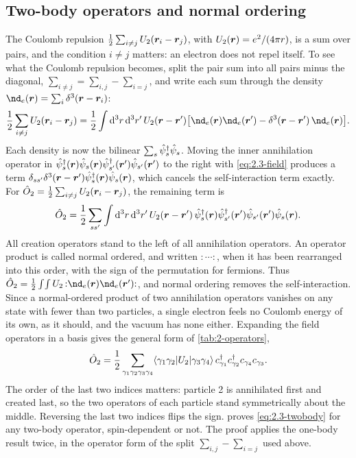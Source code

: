 \subsection{Two-body operators and normal ordering}

The Coulomb repulsion $\tfrac12\sum_{i\ne j}U_2(\bm{r}_i - \bm{r}_j)$, with $U_2(\bm{r}) = e^2/(4\pi r)$, is a sum over pairs, and the condition $i \ne j$ matters: an electron does not repel itself. To see what the Coulomb repulsion becomes, split the pair sum into all pairs minus the diagonal, $\sum_{i\ne j} = \sum_{i,j} - \sum_{i=j}$, and write each sum through the density $\nd_e(\vect{r}) = \sum_i\delta^3(\vect{r} - \vect{r}_i)$:
\begin{equation*}
  \frac12\sum_{i\ne j}U_2(\vect{r}_i - \vect{r}_j)
  = \frac12\int\dd^3r\,\dd^3r'\,U_2(\vect{r} - \vect{r}')\bigl[\nd_e(\vect{r})\nd_e(\vect{r}') - \delta^3(\vect{r} - \vect{r}')\,\nd_e(\vect{r})\bigr] .
\end{equation*}
Each density is now the bilinear $\sum_s\hat{\psi}^\dagger_s\hat{\psi}_s$. Moving the inner annihilation operator in $\hat{\psi}^\dagger_s(\bm{r})\hat{\psi}_s(\bm{r})\hat{\psi}^\dagger_{s'}(\bm{r}')\hat{\psi}_{s'}(\bm{r}')$ to the right with \cref{eq:2.3-field} produces a term $\delta_{ss'}\delta^3(\bm{r} - \bm{r}')\hat{\psi}^\dagger_s(\bm{r})\hat{\psi}_{s}(\bm{r})$, which cancels the self-interaction term exactly. For $\hat{O}_2 = \tfrac12\sum_{i\ne j}U_2(\bm{r}_i - \bm{r}_j)$, the remaining term is
\begin{equation}
  \hat{O}_2 = \frac12\sum_{ss'}\int\mathrm{d}^3r\,\mathrm{d}^3r'\,U_2(\bm{r} - \bm{r}')\,\hat{\psi}^\dagger_s(\bm{r})\hat{\psi}^\dagger_{s'}(\bm{r}')\hat{\psi}_{s'}(\bm{r}')\hat{\psi}_s(\bm{r}) .
  \label{eq:2.3-twobody-field}
\end{equation}
All creation operators stand to the left of all annihilation operators. An operator product is called normal ordered, and written $:\!\cdots\!:$, when it has been rearranged into this order, with the sign of the permutation for fermions. Thus $\op{O}_2 = \tfrac12\int\!\int U_2\,{:}\nd_e(\vect{r})\nd_e(\vect{r}'){:}$, and normal ordering removes the self-interaction. Since a normal-ordered product of two annihilation operators vanishes on any state with fewer than two particles, a single electron feels no Coulomb energy of its own, as it should, and the vacuum has none either. Expanding the field operators in a basis gives the general form of \cref{tab:2-operators},
\begin{equation}
  \hat{O}_2 = \frac12\sum_{\gamma_1\gamma_2\gamma_3\gamma_4}\langle\gamma_1\gamma_2|U_2|\gamma_3\gamma_4\rangle\,c^\dagger_{\gamma_1}c^\dagger_{\gamma_2}c_{\gamma_4}c_{\gamma_3} .
  \label{eq:2.3-twobody}
\end{equation}
The order of the last two indices matters: particle 2 is annihilated first and created last, so the two operators of each particle stand symmetrically about the middle. Reversing the last two indices flips the sign.  proves \cref{eq:2.3-twobody} for any two-body operator, spin-dependent or not. The proof applies the one-body result twice, in the operator form of the split $\sum_{i,j} - \sum_{i=j}$ used above.


